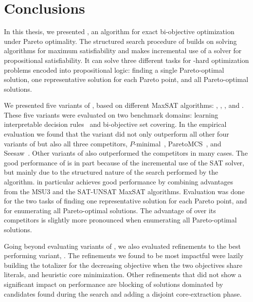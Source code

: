 \chapter{Conclusions\label{chap:conclusion}}

In this thesis, we presented \algname{}, an algorithm for exact bi-objective optimization under Pareto optimality.
The structured search procedure of \algname{} builds on solving algorithms for maximum satisfiability and makes incremental use of a solver for propositional satisfiability.
It can solve three different tasks for \NP-hard optimization problems encoded into propositional logic:
finding a single Pareto-optimal solution, one representative solution for each Pareto point, and all Pareto-optimal solutions.

We presented five variants of \algname{}, based on different MaxSAT algorithms: \satunsat{}, \unsatsat{}, \msu{}, \oll{} and \msh{}.
These five variants were evaluated on two benchmark domains: learning interpretable decision rules~\autocite{DBLP:conf/cp/MaliotovM18} and bi-objective set covering.
In the empirical evaluation we found that the \msh{} variant did not only outperform all other four variants of \algname{} but also all three competitors, $P$-minimal~\autocite{DBLP:conf/cp/SohBTB17}, ParetoMCS~\autocite{DBLP:conf/ijcai/Terra-NevesLM18a}, and Seesaw~\autocite{DBLP:conf/cp/JanotaMSM21}.
Other variants of \algname{} also outperformed the competitors in many cases.
The good performance of \algname{} is in part because of the incremental use of the SAT solver, but mainly due to the structured nature of the search performed by the algorithm.
\msh{} in particular achieves good performance by combining advantages from the MSU3 and the SAT-UNSAT MaxSAT algorithms.
Evaluation was done for the two tasks of finding one representative solution for each Pareto point, and for enumerating all Pareto-optimal solutions.
The advantage of \algname{} over its competitors is slightly more pronounced when enumerating all Pareto-optimal solutions.

Going beyond evaluating variants of \algname{}, we also evaluated refinements to the best performing variant, \msh{}.
The refinements we found to be most impactful were lazily building the totalizer for the decreasing objective when the two objectives share literals, and heuristic core minimization.
Other refinements that did not show a significant impact on performance are blocking of solutions dominated by candidates found during the search and adding a disjoint core-extraction phase.

